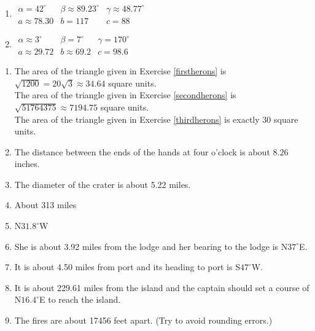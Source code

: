 \begin{multicols}{2} 

\begin{enumerate}

\setcounter{enumi}{\value{HW}}

\item $\begin{array}{lll}
\alpha = 42^{\circ} & \beta \approx 89.23^{\circ} & \gamma \approx 48.77^{\circ} \\
a \approx 78.30 & b = 117 & c = 88 \end{array}$

\item $\begin{array}{lll}
\alpha \approx 3^{\circ} & \beta = 7^{\circ} & \gamma = 170^{\circ} \\
a \approx 29.72 & b \approx 69.2 & c = 98.6 \end{array}$

\setcounter{HW}{\value{enumi}}

\end{enumerate}

\end{multicols}

\begin{enumerate}
\setcounter{enumi}{\value{HW}}
\item The area of the triangle given in Exercise \ref{firstherons} is $\sqrt{1200} = 20\sqrt{3} \approx 34.64$ square units.\\
The area of the triangle given in Exercise \ref{secondherons} is $\sqrt{51764375} \approx 7194.75$ square units.\\
The area of the triangle given in Exercise \ref{thirdherons} is exactly $30$ square units.

\item The distance between the ends of the hands at four o'clock is about $8.26$ inches.

\item  The diameter of the crater is about 5.22 miles.

\item About 313 miles

\item N$31.8^{\circ}$W

\item She is about 3.92 miles from the lodge and her bearing to the lodge is N$37^{\circ}$E. 

\item  It is about 4.50 miles from port and its heading to port is S$47^{\circ}$W.

\item  It is about 229.61 miles from the island and the captain should set a course of N$16.4^{\circ}$E to reach the island.

\item The fires are about 17456 feet apart. (Try to avoid rounding errors.)

\end{enumerate}


\closegraphsfile